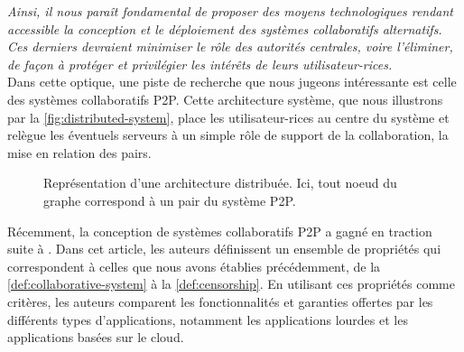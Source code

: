 \emph{Ainsi, il nous paraît fondamental de proposer des moyens technologiques rendant accessible la conception et le déploiement des systèmes collaboratifs alternatifs.
Ces derniers devraient minimiser le rôle des autorités centrales, voire l'éliminer, de façon à protéger et privilégier les intérêts de leurs utilisateur-rices.}\\

Dans cette optique, une piste de recherche que nous jugeons intéressante est celle des systèmes collaboratifs \acf{P2P}.
Cette architecture système, que nous illustrons par la \autoref{fig:distributed-system}, place les utilisateur-rices au centre du système et relègue les éventuels serveurs à un simple rôle de support de la collaboration, \eg la mise en relation des pairs.

\begin{figure}[!ht]
  \centering
  \caption[Caption for distributed-system]{
    Représentation d'une architecture distribuée\footnotemark[\value{footnote}].
    Ici, tout noeud du graphe correspond à un pair du système \ac{P2P}.}
  \label{fig:distributed-system}
\end{figure}

Récemment, la conception de systèmes collaboratifs \ac{P2P} a gagné en traction suite à \cite{localfirstsoftware2019}.
Dans cet article, les auteurs définissent un ensemble de propriétés qui correspondent à celles que nous avons établies précédemment, de la \autoref{def:collaborative-system} à la \autoref{def:censorship}.
En utilisant ces propriétés comme critères, les auteurs comparent les fonctionnalités et garanties offertes par les différents types d'applications, notamment les applications lourdes et les applications basées sur le cloud.

